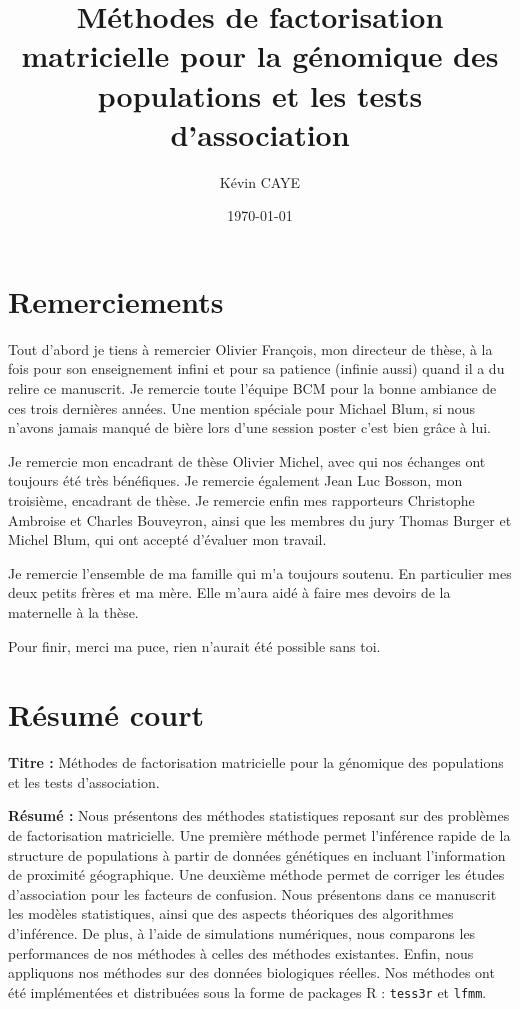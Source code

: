 \documentclass[12pt,a4paper,twoside]{ugathesis}
\author{Kévin CAYE}
\date{\today}
\title{Méthodes de factorisation matricielle pour la génomique des populations et les tests d'association}
\begin{document}
\maketitle
\tableofcontents

\baselineskip 0.7cm
\frontmatter

\chapter{Remerciements}
\label{sec:orgf7efb6f}

Tout d'abord je tiens à remercier Olivier François, mon directeur de thèse, à la
fois pour son enseignement infini et pour sa patience (infinie aussi) quand il a
du relire ce manuscrit. Je remercie toute l'équipe BCM pour la bonne ambiance de
ces trois dernières années. Une mention spéciale pour Michael Blum, si nous
n'avons jamais manqué de bière lors d'une session poster c'est bien grâce à lui.

Je remercie mon encadrant de thèse Olivier Michel, avec qui nos échanges ont
toujours été très bénéfiques. Je remercie également Jean Luc Bosson, mon
troisième, encadrant de thèse. Je remercie enfin mes rapporteurs Christophe
Ambroise et Charles Bouveyron, ainsi que les membres du jury Thomas Burger et
Michel Blum, qui ont accepté d'évaluer mon travail.

Je remercie l'ensemble de ma famille qui m'a toujours soutenu. En particulier
mes deux petits frères et ma mère. Elle m'aura aidé à faire mes devoirs de la
maternelle à la thèse.

Pour finir, merci ma puce, rien n'aurait été possible sans toi.

\chapter{Résumé court}
\label{sec:orgea44c2b}

\noindent \textbf{Titre :} Méthodes de factorisation matricielle pour la génomique des
populations et les tests d'association.

\noindent \textbf{Résumé :} Nous présentons des méthodes statistiques reposant sur des
problèmes de factorisation matricielle. Une première méthode permet l'inférence
rapide de la structure de populations à partir de données génétiques en incluant
l'information de proximité géographique. Une deuxième méthode permet de corriger
les études d'association pour les facteurs de confusion. Nous présentons dans ce
manuscrit les modèles statistiques, ainsi que des aspects théoriques des
algorithmes d'inférence. De plus, à l'aide de simulations numériques, nous
comparons les performances de nos méthodes à celles des méthodes existantes.
Enfin, nous appliquons nos méthodes sur des données biologiques réelles. Nos
méthodes ont été implémentées et distribuées sous la forme de packages R :
\texttt{tess3r} et \texttt{lfmm}.
\end{document}
